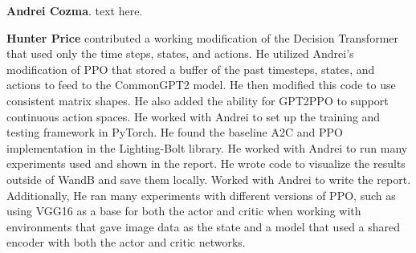\documentclass[conference]{IEEEtran}
\begin{document}
\textbf{Andrei Cozma}. text here.


\textbf{Hunter Price} contributed a working modification of the Decision Transformer that used only the time steps, states, and actions. He utilized Andrei's modification of PPO that stored a buffer of the past timesteps, states, and actions to feed to the CommonGPT2 model. He then modified this code to use consistent matrix shapes. He also added the ability for GPT2PPO to support continuous action spaces. He worked with Andrei to set up the training and testing framework in PyTorch. He found the baseline A2C and PPO implementation in the Lighting-Bolt library. He worked with Andrei to run many experiments used and shown in the report. He wrote code to visualize the results outside of WandB and save them locally. Worked with Andrei to write the report. Additionally, He ran many experiments with different versions of PPO, such as using VGG16 as a base for both the actor and critic when working with environments that gave image data as the state and a model that used a shared encoder with both the actor and critic networks.

\end{document}
